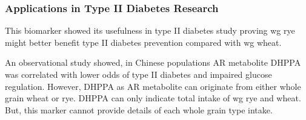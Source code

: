 %			

\subsubsection{Applications in Type II Diabetes Research}
This biomarker showed its usefulness in type II diabetes study proving \acrshort{wg} rye might better benefit type II diabetes prevention compared with \acrshort{wg} wheat.

An observational study showed\cite{ISI:000430455900021}, in Chinese populations AR metabolite DHPPA was correlated with lower odds of type II diabetes and impaired glucose regulation. However, DHPPA as AR metabolite can originate from either whole grain wheat or rye. 
DHPPA can only indicate total intake of \acrshort{wg} rye and wheat. But, this marker cannot provide details of each whole grain type intake.

